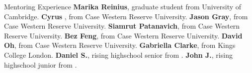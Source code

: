 \begin{rubric}{Mentoring Experience}
\entry*[2021-2022] \textbf{Marika Reinius}, graduate student from University of Cambridge.
\entry*[2022-2023] \textbf{Cyrus }, from Case Western Reserve University.
\entry*[2022-2023] \textbf{Jason Gray}, from Case Western Reserve University.
\entry*[2022-2023] \textbf{Siamrut Patanavich}, from Case Western Reserve University.
\entry*[2022-2023] \textbf{Bez Feng}, from Case Western Reserve University.
\entry*[2022-2023] \textbf{David Oh}, from Case Western Reserve University.
\entry*[Summer 2022] \textbf{Gabriella Clarke}, from Kings College London.
\entry*[Summer 2022] \textbf{Daniel S.}, rising highschool senior from .
\entry*[Summer 2023] \textbf{John J.}, rising highschool junior from .
\end{rubric}